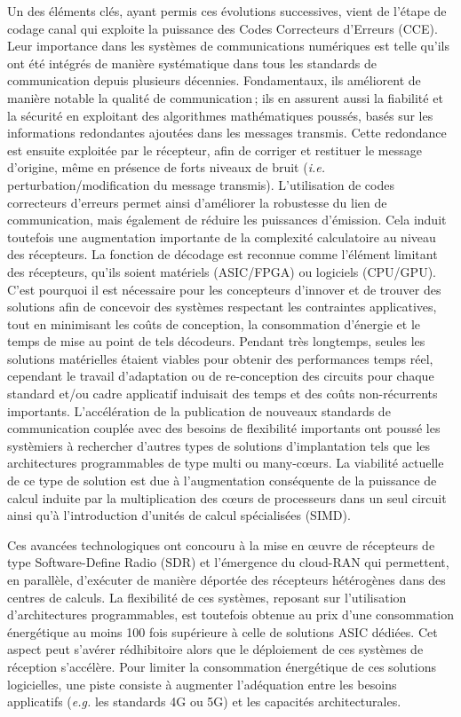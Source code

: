 \documentclass[../main.tex]{subfiles}
\begin{document}
Un des éléments clés, ayant permis ces évolutions successives, vient de l’étape de codage canal qui exploite la puissance des Codes Correcteurs d’Erreurs (CCE).
Leur importance dans les systèmes de communications numériques est telle qu’ils ont été intégrés de manière systématique dans tous les standards de communication depuis plusieurs décennies.
Fondamentaux, ils améliorent de manière notable la qualité de communication ; ils en assurent aussi la fiabilité et la sécurité en exploitant des algorithmes mathématiques poussés, basés sur les informations redondantes ajoutées dans les messages transmis.
Cette redondance est ensuite exploitée par le récepteur, afin de corriger et restituer le message d'origine, même en présence de forts niveaux de bruit (\textit{i.e.} perturbation/modification du message transmis).
L’utilisation de codes correcteurs d’erreurs permet ainsi d’améliorer la robustesse du lien de communication, mais également de réduire les puissances d’émission.
Cela induit toutefois une augmentation importante de la complexité calculatoire au niveau des récepteurs.
La fonction de décodage est reconnue comme l’élément limitant des récepteurs, qu’ils soient matériels (ASIC/FPGA) ou logiciels (CPU/GPU).
C'est pourquoi il est nécessaire pour les concepteurs d'innover et de trouver des solutions afin de concevoir des systèmes respectant les contraintes applicatives, tout en minimisant les coûts de conception, la consommation d’énergie et le temps de mise au point de tels décodeurs.
Pendant très longtemps, seules les solutions matérielles étaient viables pour obtenir des performances temps réel, cependant le travail d’adaptation ou de re-conception des circuits pour chaque standard et/ou cadre applicatif induisait des temps et des coûts non-récurrents importants.
L’accélération de la publication de nouveaux standards de communication couplée avec des besoins de flexibilité importants ont poussé les systèmiers à rechercher d’autres types de solutions d’implantation tels que les architectures programmables de type multi ou many-cœurs.
La viabilité actuelle de ce type de solution est due à l’augmentation conséquente de la puissance de calcul induite par la multiplication des cœurs de processeurs dans un seul circuit ainsi qu’à l’introduction d’unités de calcul spécialisées (SIMD).



Ces avancées technologiques ont concouru à la mise en œuvre de récepteurs de type Software-Define Radio (SDR) et l’émergence du cloud-RAN qui permettent, en parallèle, d’exécuter de manière déportée des récepteurs hétérogènes dans des centres de calculs.
La flexibilité de ces systèmes, reposant sur l’utilisation d’architectures programmables, est toutefois obtenue au prix d’une consommation énergétique au moins 100 fois supérieure à celle de solutions ASIC dédiées.
Cet aspect peut s’avérer rédhibitoire alors que le déploiement de ces systèmes de réception s’accélère.
Pour limiter la consommation énergétique de ces solutions logicielles, une piste consiste à augmenter l’adéquation entre les besoins applicatifs (\textit{e.g.} les standards 4G ou 5G) et les capacités architecturales.
\end{document}
